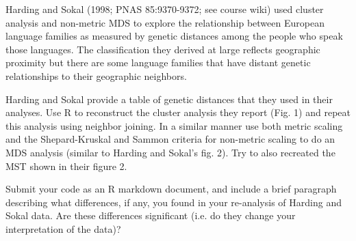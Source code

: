 \medskip
\begin{assignment}
Harding and Sokal (1998; PNAS 85:9370-9372; see course wiki) used cluster analysis and non-metric MDS to explore the relationship between European language families as measured by genetic distances among the people who speak those languages.  The classification they derived at large reflects geographic proximity but there are some language families that have distant genetic relationships to their geographic neighbors.

\medskip
Harding and Sokal provide a table of genetic distances that they used in their analyses. Use R to reconstruct the cluster analysis they report (Fig. 1) and repeat this analysis using neighbor joining. In a similar manner use both metric scaling and the Shepard-Kruskal and Sammon criteria for non-metric scaling to do an MDS analysis (similar to Harding and Sokal's fig. 2).  Try to also recreated the MST shown in their figure 2.

\medskip
Submit your code as an R markdown document, and include a brief paragraph describing what differences, if any, you found in your re-analysis of Harding and Sokal data. Are these differences significant (i.e. do they change your interpretation of the data)?

\end{assignment}



